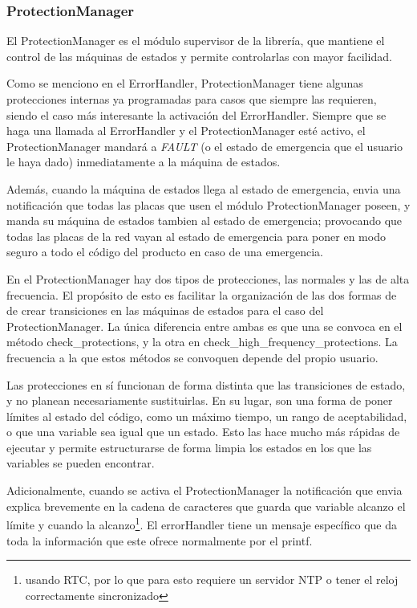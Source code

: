 \documentclass{report}
\begin{document}
\subsubsection{ProtectionManager}
El ProtectionManager es el módulo supervisor de la librería, que mantiene el control de las máquinas de estados y permite controlarlas con mayor facilidad. 
\par \vspace{0.3cm}
Como se menciono en el ErrorHandler, ProtectionManager tiene algunas protecciones internas ya programadas para casos que siempre las requieren, siendo el caso más interesante la activación del ErrorHandler. Siempre que se haga una llamada al ErrorHandler y el ProtectionManager esté activo, el ProtectionManager mandará a \textit{FAULT} (o el estado de emergencia que el usuario le haya dado) inmediatamente a la máquina de estados. 
\par \vspace{0.3cm}
Además, cuando la máquina de estados llega al estado de emergencia, envia una notificación que todas las placas que usen el módulo ProtectionManager poseen, y manda su máquina de estados tambien al estado de emergencia; provocando que todas las placas de la red vayan al estado de emergencia para poner en modo seguro a todo el código del producto en caso de una emergencia. 
\par \vspace{0.3cm}
En el ProtectionManager hay dos tipos de protecciones, las normales y las de alta frecuencia. El propósito de esto es facilitar la organización de las dos formas de de crear transiciones en las máquinas de estados para el caso del ProtectionManager. La única diferencia entre ambas es que una se convoca en el método check\_protections, y la otra en check\_high\_frequency\_protections. La frecuencia a la que estos métodos se convoquen depende del propio usuario. 
\par \vspace{0.3cm}
Las protecciones en sí funcionan de forma distinta que las transiciones de estado, y no planean necesariamente sustituirlas. En su lugar, son una forma de poner límites al estado del código, como un máximo tiempo, un rango de aceptabilidad, o que una variable sea igual que un estado. Esto las hace mucho más rápidas de ejecutar y permite estructurarse de forma limpia los estados en los que las variables se pueden encontrar. \par 
Adicionalmente, cuando se activa el ProtectionManager la notificación que envia explica brevemente en la cadena de caracteres que guarda que variable alcanzo el límite y cuando la alcanzo\footnote{usando RTC, por lo que para esto requiere un servidor NTP o tener el reloj correctamente sincronizado}. El errorHandler tiene un mensaje específico que da toda la información que este ofrece normalmente por el printf. 
\end{document}
